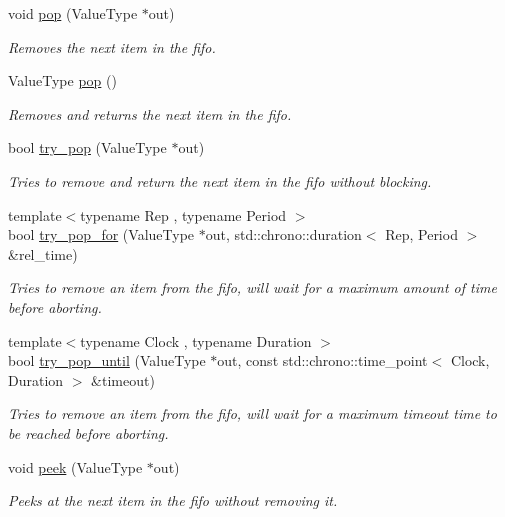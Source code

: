 \begin{DoxyCompactItemize}
void \hyperlink{classcpen333_1_1process_1_1fifo_af29e5bd6d8b0fe551c4d7532ffcb331e}{pop} (Value\+Type $\ast$out)
\begin{DoxyCompactList}\small\item\em Removes the next item in the fifo. \end{DoxyCompactList}\item 
Value\+Type \hyperlink{classcpen333_1_1process_1_1fifo_a40796c0eb39299ff4f8c49a789268386}{pop} ()
\begin{DoxyCompactList}\small\item\em Removes and returns the next item in the fifo. \end{DoxyCompactList}\item 
bool \hyperlink{classcpen333_1_1process_1_1fifo_a6f3e1f84d8a72e620f44bc5c018b3a9c}{try\+\_\+pop} (Value\+Type $\ast$out)
\begin{DoxyCompactList}\small\item\em Tries to remove and return the next item in the fifo without blocking. \end{DoxyCompactList}\item 
{\footnotesize template$<$typename Rep , typename Period $>$ }\\bool \hyperlink{classcpen333_1_1process_1_1fifo_a6411f9f377c2be43500bc53883651120}{try\+\_\+pop\+\_\+for} (Value\+Type $\ast$out, std\+::chrono\+::duration$<$ Rep, Period $>$ \&rel\+\_\+time)
\begin{DoxyCompactList}\small\item\em Tries to remove an item from the fifo, will wait for a maximum amount of time before aborting. \end{DoxyCompactList}\item 
{\footnotesize template$<$typename Clock , typename Duration $>$ }\\bool \hyperlink{classcpen333_1_1process_1_1fifo_a7e66a7f6e91c0725ad6a5f3940668e64}{try\+\_\+pop\+\_\+until} (Value\+Type $\ast$out, const std\+::chrono\+::time\+\_\+point$<$ Clock, Duration $>$ \&timeout)
\begin{DoxyCompactList}\small\item\em Tries to remove an item from the fifo, will wait for a maximum timeout time to be reached before aborting. \end{DoxyCompactList}\item 
void \hyperlink{classcpen333_1_1process_1_1fifo_ac501e62c2253097f89d713558d888d16}{peek} (Value\+Type $\ast$out)
\begin{DoxyCompactList}\small\item\em Peeks at the next item in the fifo without removing it. \end{DoxyCompactList}\item 

\end{DoxyCompactItemize}
